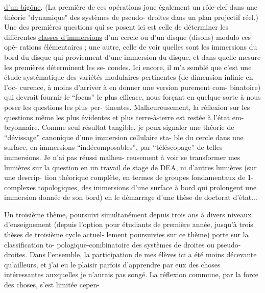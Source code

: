 
\uline{d'un bigône}. (La première de ces opérations joue également un
rôle-clef dans une théorie "dynamique" des systèmes de pseudo-%
droites dans un plan projectif réel.) Une des premières questions
qui se posent ici est celle de déterminer les différentes \uline{classes
d'immersions} d'un cercle ou d'un disque (disons) modulo ces opé-%
rations élémentaires ; une autre, celle de voir quelles sont les
immersions du bord du disque qui proviennent d'une immersion du
disque, et dans quelle mesure les premières déterminent les se-%
condes. Ici encore, il m'a semblé que c'est une étude systématique
des variétés modulaires pertinentes (de dimension infinie en l'oc-%
curence, à moins d'arriver à en donner une version purement com-%
binatoire) qui devrait fournir le ``focus'' le plus efficace, nous
forçant en quelque sorte à nous poser les questions les plus per-%
tinentes. Malheureusement, la réflexion sur les questions même
les plus évidentes et plus terre-à-terre est restée à l'état em-%
bryonnaire. Comme seul résultat tangible, je peux signaler une
théorie de ``dévissage'' canonique d'une immersion cellulaire sta-%
ble du cercle dans une surface, en immersions ``indécomposables'',
par ``téléscopage'' de telles immersions. Je n'ai pas réussi malheu-%
reusement à voir se transformer mes lumières sur la question en
un travail de stage de DEA, ni d'autres lumières (sur une descrip-%
tion théorique complète, en termes de groupes fondamentaux de
1-complexes topologiques, des immersions d'une surface à bord qui
prolongent une immersion donnée de son bord) en le démarrage d'une
thèse de doctorat d'état...

Un troisième thème, poursuivi simultanément depuis trois
ans à divers niveaux d'enseignement (depuis l'option pour étudiants
de première année, jusqu'à trois thèses de troisième cycle actuel-%
lement poursuivies sur ce thème) porte sur la classification to-%
pologique-combinatoire des systèmes de droites ou pseudo-droites.
Dans l'ensemble, la participation de mes élèves ici a été moins
décevante qu'ailleurs, et j'ai eu le plaisir parfois d'apprendre
par eux des choses intéressantes auxquelles je n'aurais pas songé.
La réflexion commune, par la force des choses, s'est limitée cepen-%


